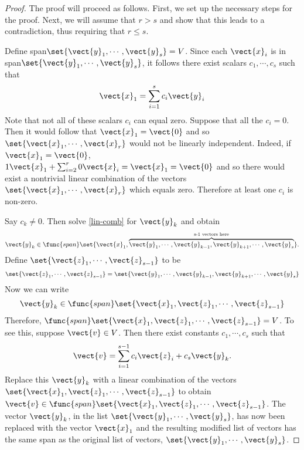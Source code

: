\begin{proof} The proof will proceed as follows. First, we set up the necessary steps for the proof. Next, we will assume that $r > s$ and show that this leads to a contradiction, thus requiring that $r \leq s$. 

Define span$\set{\vect{y}_{1},\cdots ,\vect{y}_{s}} = V$. Since each $\vect{x}_i$ is in  span$\set{\vect{y}_{1},\cdots ,\vect{y}_{s}}$, it follows there exist scalars $c_{1},\cdots ,c_{s}$
such that 
\begin{equation}
\vect{x}_{1}=\sum_{i=1}^{s}c_{i}\vect{y}_{i}  \label{lin-comb}
\end{equation}
Note that not all of these scalars $c_i$ can equal zero. Suppose that all the $c_i=0$. Then it
would follow that $\vect{x}_{1}=\vect{0}$ and so $\set{\vect{x}
_{1},\cdots ,\vect{x}_{r}} $ would not be linearly independent.
Indeed, if $\vect{x}_{1}=\vect{0}$, $1\vect{x}_{1}+\sum_{i=2}^{r}0
\vect{x}_{i}=\vect{x}_{1}=\vect{0}$ and so there would exist a
nontrivial linear combination of the vectors $\set{\vect{x}_{1},\cdots ,
\vect{x}_{r}} $ which equals zero. Therefore at least one $c_i$ is non-zero. 

Say $c_{k}\neq 0$. Then solve \ref{lin-comb} for $\vect{y}_{k}$ and obtain 
\begin{equation*}
\vect{y}_{k}\in \func{span}\set{\vect{x}_{1},\overset{\text{s-1
vectors here}}{\overbrace{\vect{y}_{1},\cdots ,\vect{y}_{k-1},\vect{y}
_{k+1},\cdots ,\vect{y}_{s}}}} .
\end{equation*}
Define $\set{\vect{z}_{1},\cdots ,\vect{z}_{s-1}} $ to be
\begin{equation*}
\set{\vect{z}_{1},\cdots ,\vect{z}_{s-1}} = \set{
\vect{y}_{1},\cdots ,\vect{y}_{k-1},\vect{y}_{k+1},\cdots ,\vect{y}
_{s}}
\end{equation*}
Now we can write 
\begin{equation*}
\vect{y}_{k}\in \func{span}\set{\vect{x}_{1}, \vect{z}_{1},\cdots, \vect{z}_{s-1}} 
\end{equation*}
Therefore, $\func{span}\set{\vect{x}_{1},\vect{z}_{1},\cdots ,\vect{z
}_{s-1}}=V$. To see this, suppose $\vect{v}\in V$. Then there exist constants $
c_{1},\cdots ,c_{s}$ such that 
\begin{equation*}
\vect{v}=\sum_{i=1}^{s-1}c_{i}\vect{z}_{i}+c_{s}\vect{y}_{k}.
\end{equation*}
Replace this $\vect{y}_{k}$ with a linear combination of the
vectors $\set{\vect{x}_{1},\vect{z}_{1},\cdots ,\vect{z}_{s-1}}$
to obtain $\vect{v}\in \func{span}\set{\vect{x}_{1},\vect{z}
_{1},\cdots ,\vect{z}_{s-1}}$. The vector $\vect{y}_{k}$, in the
list $\set{\vect{y}_{1},\cdots ,\vect{y}_{s}}$, has now been
replaced with the vector $\vect{x}_{1}$ and the resulting modified list of
vectors has the same span as the original list of vectors, $\set{\vect{y
}_{1},\cdots ,\vect{y}_{s}}$.


\end{proof}
